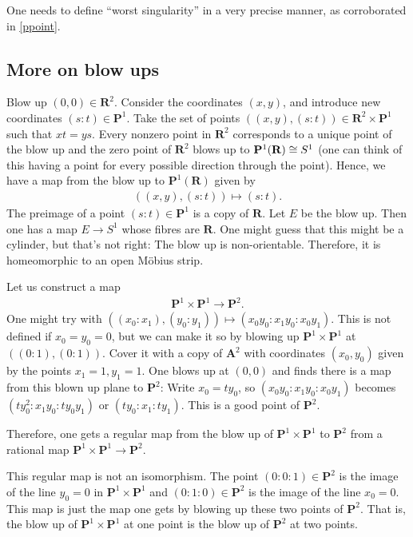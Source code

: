 \documentclass [11 pt, oneside] {article}
\begin{document}
\begin{warn}
	One needs to define ``worst singularity'' in a very precise manner, as corroborated in \cref{ppoint}. 
\end{warn}

\subsection{More on blow ups}
\begin{example}\label{}
Blow up $(0,0)\in  \mathbf{R}^2$. Consider the coordinates $(x,y)$, and introduce new coordinates $(s:t) \in \mathbf{P}^1$. Take the set of points $((x,y), (s:t)) \in \mathbf{R}^2\times \mathbf{P}^1$ such that $xt=ys$. Every nonzero point in $\mathbf{R}^2$ corresponds to a unique point of the blow up and the zero point of $\mathbf{R}^2$ blows up to $\mathbf{P}^1(\mathbf{R})\cong S^1$  (one can think of this having a point for every possible direction through the point). Hence, we have a map from the blow up to $\mathbf{P}^1(\mathbf{R})$ given by
\begin{align*}
	((x,y),  (s:t)) \longmapsto (s:t).
\end{align*}
The preimage of a point $(s:t) \in \mathbf{P}^1$ is a copy of $\mathbf{R}$. Let $E$ be the blow up. Then one has a map $E\longrightarrow S^1$ whose fibres are $\mathbf{R}$. One might guess that this might be a cylinder, but that's not right: The blow up is non-orientable. Therefore, it is homeomorphic to an open M\"obius strip. 
\end{example}

\begin{example}[ ]\label{}\text{}
Let us construct a map 
\begin{align*}
	\mathbf{P}^1\times \mathbf{P}^1\longrightarrow \mathbf{P}^2.
\end{align*}
One might try with $((x_0:x_1),(y_0:y_1)) \longmapsto (x_0y_0:x_1y_0:x_0y_1)$. This is not defined if $x_0=y_0=0$, but we can make it so by blowing up $\mathbf{P}^1\times \mathbf{P}^1$ at $((0:1), (0:1) )$. Cover it with a copy of $\mathbf{A}^2$ with coordinates $(x_0,y_0)$ given by the points $x_1=1,y_1=1$. One blows up at $(0,0)$ and finds there is a map from this blown up plane to $\mathbf{P}^2$: Write $x_0=ty_0$, so $(x_0y_0:x_1y_0:x_0y_1)$ becomes $(ty_0^2:x_1y_0:ty_0y_1)$ or $(ty_0:x_1:ty_1)$. This is a good point of $\mathbf{P}^2$.

Therefore, one gets a regular map from the blow up of $\mathbf{P}^1\times \mathbf{P}^1$ to $\mathbf{P}^2$ from a rational map $\mathbf{P}^1\times \mathbf{P}^1\longrightarrow \mathbf{P}^2$.

\begin{remark}
	This regular map is not an isomorphism. The point $(0:0:1)\in  \mathbf{P}^2$ is the image of the line $y_0=0$ in $\mathbf{P}^1\times \mathbf{P}^1$ and $(0:1:0)\in \mathbf{P}^2$ is the image of the line $x_0=0$. This map is just the map one gets by blowing up these two points of $\mathbf{P}^2$. That is, the blow up of $\mathbf{P}^1\times \mathbf{P}^1$ at one point is the blow up of $\mathbf{P}^2$ at two points.
\end{remark}
\end{example}
\end{document}
